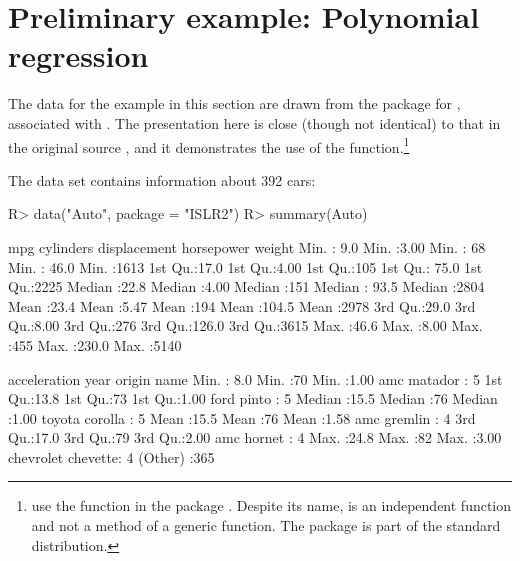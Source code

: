 \documentclass[
]{jss}
\begin{document}
\section{Preliminary example: Polynomial
regression}\label{preliminary-example-polynomial-regression}

The data for the example in this section are drawn from the 
package for , associated with \citet{JamesEtAl:2021}. The
presentation here is close (though not identical) to that in the
original source \citep[ Secs. 5.1, 5.3]{JamesEtAl:2021}, and it
demonstrates the use of the  function.\footnote{\citet{JamesEtAl:2021}
  use the  function in the  package
  \citep{CantyRipley2022, DavisonHinkley:1997}. Despite its name,
   is an independent function and not a method of a
   generic function. The  package is part of the
  standard  distribution.}

The  data set contains information about 392 cars:

\begin{CodeChunk}
\begin{CodeInput}
R> data("Auto", package = "ISLR2")
R> summary(Auto)
\end{CodeInput}
\begin{CodeOutput}
      mpg         cylinders     displacement   horsepower        weight
 Min.   : 9.0   Min.   :3.00   Min.   : 68   Min.   : 46.0   Min.   :1613
 1st Qu.:17.0   1st Qu.:4.00   1st Qu.:105   1st Qu.: 75.0   1st Qu.:2225
 Median :22.8   Median :4.00   Median :151   Median : 93.5   Median :2804
 Mean   :23.4   Mean   :5.47   Mean   :194   Mean   :104.5   Mean   :2978
 3rd Qu.:29.0   3rd Qu.:8.00   3rd Qu.:276   3rd Qu.:126.0   3rd Qu.:3615
 Max.   :46.6   Max.   :8.00   Max.   :455   Max.   :230.0   Max.   :5140

  acceleration       year        origin                     name
 Min.   : 8.0   Min.   :70   Min.   :1.00   amc matador       :  5
 1st Qu.:13.8   1st Qu.:73   1st Qu.:1.00   ford pinto        :  5
 Median :15.5   Median :76   Median :1.00   toyota corolla    :  5
 Mean   :15.5   Mean   :76   Mean   :1.58   amc gremlin       :  4
 3rd Qu.:17.0   3rd Qu.:79   3rd Qu.:2.00   amc hornet        :  4
 Max.   :24.8   Max.   :82   Max.   :3.00   chevrolet chevette:  4
                                            (Other)           :365
\end{CodeOutput}
\end{CodeChunk}
\end{document}
